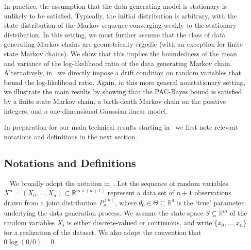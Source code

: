 \documentclass[11pt]{amsart}
\newcommand{\datas}{x_0,\dots,x_n}
\begin{document}
In practice, the assumption that the data generating model is stationary is unlikely to be satisfied. 
Typically, the initial distribution is arbitrary, with the state distribution of the Markov sequence converging weakly to the stationary distribution.
In this setting, we must further assume that the class of data generating Markov chains are geometrically ergodic (with an exception for finite state Markov chains). %
We show that this implies the boundedness of the mean and variance of the log-likelihood ratio of the data generating Markov chain. Alternatively, in~ we directly impose a drift condition on random variables that bound the log-likelihood ratio. Again, in this more general nonstationary setting, we illustrate the main results by showing that the PAC-Bayes bound is satisfied by a finite state Markov chain, a birth-death Markov chain on the positive integers, and a one-dimensional Gaussian linear model.

In preparation for our main technical results starting in~ we first note relevant notations and definitions in the next section.

\subsection{Notations and Definitions}~\label{sec:notation}
We broadly adopt the notation in~\cite{pierre}. Let the sequence of random variables $X^n = (X_0,\ldots,X_n) \subset \mathbb R^{m\times (n+1)}$ represent a data set of $n+1$ observations drawn from a joint distribution $P_{\theta_0}^{(n)}$, where $\theta_0 \in \Theta \subseteq \mathbb R^d$ is the `true' parameter underlying the data generation process. 
We assume the state space $S \subseteq \mathbb R^m$ of the random variables $X_i$ is either discrete-valued or continuous, and write $\{\datas\}$ for a realization of the dataset. We also adopt the convention that $0 \log (0/0) = 0$.
\end{document}
